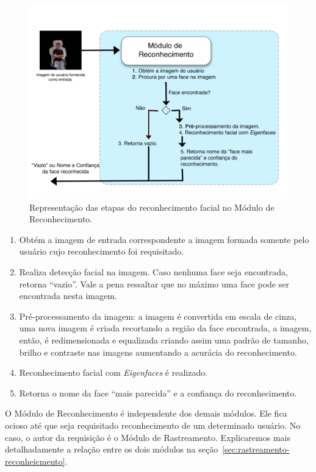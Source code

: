 		\begin{figure}[hbt]
			\begin{center}
				\includegraphics[scale=2.0]{figuras/4.ProblemaEProposta/reconhecimento.png}
			\end{center}
			\caption{Representação das etapas do reconhecimento facial no Módulo de Reconhecimento.}
			\label{fig:processo-reconhecimento}
		\end{figure}

		\begin{enumerate}
			\item Obtém a imagem de entrada correspondente a imagem formada somente pelo usuário cujo reconhecimento foi requisitado.
			\item Realiza detecção facial na imagem. Caso nenhuma face seja encontrada, retorna ``vazio''. Vale a pena ressaltar que no máximo uma face pode ser encontrada nesta imagem.
			\item Pré-processamento da imagem: a imagem é convertida em escala de cinza, uma nova imagem é criada recortando a região da face encontrada, a imagem, então, é redimensionada e equalizada criando assim uma padrão de tamanho, brilho e contraste nas imagens aumentando a acurácia do reconhecimento.
			\item Reconhecimento facial com \textit{Eigenfaces} é realizado.
			\item Retorna o nome da face ``mais parecida'' e a confiança do reconhecimento.
		\end{enumerate}

	O Módulo de Reconhecimento é independente dos demais módulos. Ele fica ocioso até que seja requisitado reconhecimento de um determinado usuário. No caso, o autor da requisição é o Módulo de Rastreamento. Explicaremos mais detalhadamente a relação entre os dois módulos na seção~\ref{sec:rastreamento-reconheicmento}.

